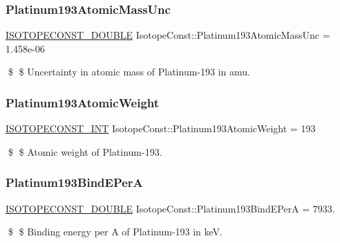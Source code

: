 \subsubsection{\texorpdfstring{Platinum193\+Atomic\+Mass\+Unc}{Platinum193AtomicMassUnc}}
{\footnotesize\ttfamily \mbox{\hyperlink{group___isotope_const-_macros_ga8f45a7272ce02c0b4c65c44636ed719a}{I\+S\+O\+T\+O\+P\+E\+C\+O\+N\+S\+T\+\_\+\+D\+O\+U\+B\+LE}} Isotope\+Const\+::\+Platinum193\+Atomic\+Mass\+Unc = 1.\+458e-\/06}

\$ \$ Uncertainty in atomic mass of Platinum-\/193 in amu. \mbox{\label{group___isotope_const-_platinum-_pt193_gad6f83d84ffd95b36f911c73458ccd7ab}} 
\subsubsection{\texorpdfstring{Platinum193\+Atomic\+Weight}{Platinum193AtomicWeight}}
{\footnotesize\ttfamily \mbox{\hyperlink{group___isotope_const-_macros_ga5f18360b3e99483a35c32d789e62621c}{I\+S\+O\+T\+O\+P\+E\+C\+O\+N\+S\+T\+\_\+\+I\+NT}} Isotope\+Const\+::\+Platinum193\+Atomic\+Weight = 193}

\$ \$ Atomic weight of Platinum-\/193. \mbox{\label{group___isotope_const-_platinum-_pt193_ga4ec22c771b2d55701623ef5bf7bda71f}} 
\subsubsection{\texorpdfstring{Platinum193\+Bind\+E\+PerA}{Platinum193BindEPerA}}
{\footnotesize\ttfamily \mbox{\hyperlink{group___isotope_const-_macros_ga8f45a7272ce02c0b4c65c44636ed719a}{I\+S\+O\+T\+O\+P\+E\+C\+O\+N\+S\+T\+\_\+\+D\+O\+U\+B\+LE}} Isotope\+Const\+::\+Platinum193\+Bind\+E\+PerA = 7933.}

\$ \$ Binding energy per A of Platinum-\/193 in keV. \mbox{\label{group___isotope_const-_platinum-_pt193_ga014df1422f7568870de4b7968473d8c4}} 
